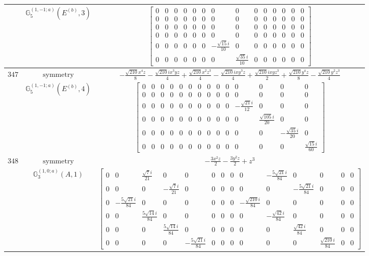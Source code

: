 \documentclass[fleqn,8pt,landscape]{jsarticle}
\begin{document}
\begin{longtable}{ccc}
$  $ & $ \mathbb{G}_{5}^{(1,-1;a)}(E^{(b)},3) $ & $ \begin{bmatrix} 0 & 0 & 0 & 0 & 0 & 0 & 0 & 0 & 0 & 0 & 0 & 0 & 0 & 0 \\ 0 & 0 & 0 & 0 & 0 & 0 & 0 & 0 & 0 & 0 & 0 & 0 & 0 & 0 \\ 0 & 0 & 0 & 0 & 0 & 0 & 0 & 0 & 0 & 0 & 0 & 0 & 0 & 0 \\ 0 & 0 & 0 & 0 & 0 & 0 & 0 & 0 & 0 & 0 & 0 & 0 & 0 & 0 \\ 0 & 0 & 0 & 0 & 0 & 0 & - \frac{\sqrt{15} i}{10} & 0 & 0 & 0 & 0 & 0 & 0 & 0 \\ 0 & 0 & 0 & 0 & 0 & 0 & 0 & \frac{\sqrt{35} i}{10} & 0 & 0 & 0 & 0 & 0 & 0 \end{bmatrix} $ \\ \hline
$ 347 $ & $ \text{symmetry} $ & $ - \frac{\sqrt{210} x^{4} z}{8} - \frac{\sqrt{210} i x^{3} y z}{4} + \frac{\sqrt{210} x^{2} z^{3}}{4} - \frac{\sqrt{210} i x y^{3} z}{4} + \frac{\sqrt{210} i x y z^{3}}{2} + \frac{\sqrt{210} y^{4} z}{8} - \frac{\sqrt{210} y^{2} z^{3}}{4} $ \\
$  $ & $ \mathbb{G}_{5}^{(1,-1;a)}(E^{(b)},4) $ & $ \begin{bmatrix} 0 & 0 & 0 & 0 & 0 & 0 & 0 & 0 & 0 & 0 & 0 & 0 & 0 & 0 \\ 0 & 0 & 0 & 0 & 0 & 0 & 0 & 0 & 0 & 0 & 0 & 0 & 0 & 0 \\ 0 & 0 & 0 & 0 & 0 & 0 & 0 & 0 & 0 & 0 & - \frac{\sqrt{21} i}{12} & 0 & 0 & 0 \\ 0 & 0 & 0 & 0 & 0 & 0 & 0 & 0 & 0 & 0 & 0 & \frac{\sqrt{105} i}{20} & 0 & 0 \\ 0 & 0 & 0 & 0 & 0 & 0 & 0 & 0 & 0 & 0 & 0 & 0 & - \frac{\sqrt{35} i}{20} & 0 \\ 0 & 0 & 0 & 0 & 0 & 0 & 0 & 0 & 0 & 0 & 0 & 0 & 0 & \frac{\sqrt{15} i}{60} \end{bmatrix} $ \\ \hline
$ 348 $ & $ \text{symmetry} $ & $ - \frac{3 x^{2} z}{2} - \frac{3 y^{2} z}{2} + z^{3} $ \\
$  $ & $ \mathbb{G}_{3}^{(1,0;a)}(A,1) $ & $ \begin{bmatrix} 0 & 0 & \frac{\sqrt{7} i}{21} & 0 & 0 & 0 & 0 & 0 & 0 & - \frac{5 \sqrt{21} i}{84} & 0 & 0 & 0 & 0 \\ 0 & 0 & 0 & - \frac{\sqrt{7} i}{21} & 0 & 0 & 0 & 0 & 0 & 0 & - \frac{5 \sqrt{21} i}{84} & 0 & 0 & 0 \\ 0 & - \frac{5 \sqrt{21} i}{84} & 0 & 0 & 0 & 0 & 0 & 0 & - \frac{\sqrt{210} i}{84} & 0 & 0 & 0 & 0 & 0 \\ 0 & 0 & \frac{5 \sqrt{14} i}{84} & 0 & 0 & 0 & 0 & 0 & 0 & - \frac{\sqrt{42} i}{84} & 0 & 0 & 0 & 0 \\ 0 & 0 & 0 & \frac{5 \sqrt{14} i}{84} & 0 & 0 & 0 & 0 & 0 & 0 & \frac{\sqrt{42} i}{84} & 0 & 0 & 0 \\ 0 & 0 & 0 & 0 & - \frac{5 \sqrt{21} i}{84} & 0 & 0 & 0 & 0 & 0 & 0 & \frac{\sqrt{210} i}{84} & 0 & 0 \end{bmatrix} $ \\ \hline

\end{longtable}
\end{document}
